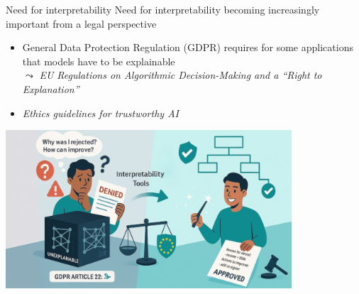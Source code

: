 \documentclass[10pt,compress,t,notes=noshow, xcolor=table]{beamer}
\begin{document}
\begin{frame}{Need for interpretability}
    Need for interpretability becoming increasingly important from a legal perspective
    
    \begin{itemize}
    \item General Data Protection Regulation (GDPR) requires for some applications that models have to be explainable 
    \\
    $\leadsto$ \textit{EU Regulations on Algorithmic Decision-Making and a ``Right to Explanation''} 
    
    \item \textit{Ethics guidelines for trustworthy AI}


    \end{itemize}
    \medskip
    
    \centering\includegraphics[width=0.8\textwidth]{figure/rightstoexplain.jpg}
\end{frame}





\end{document}
